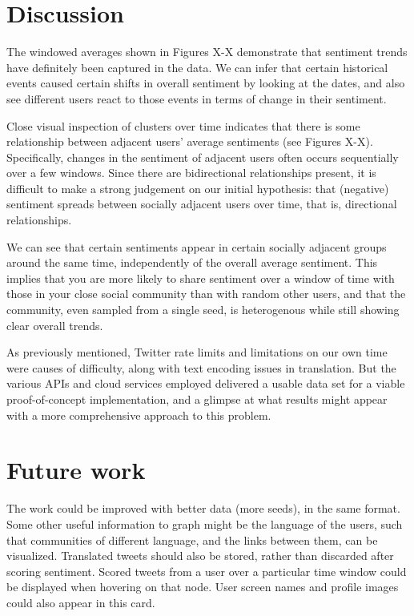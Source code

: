 \documentclass[11pt]{article}
\begin{document}
\section{Discussion}
The windowed averages shown in Figures X-X demonstrate that sentiment trends have definitely been captured in the data. We can infer that certain historical events caused certain shifts in overall sentiment by looking at the dates, and also see different users react to those events in terms of change in their sentiment.\newline

Close visual inspection of clusters over time indicates that there is some relationship between adjacent users' average sentiments (see Figures X-X). Specifically, changes in the sentiment of adjacent users often occurs sequentially over a few windows. Since there are bidirectional relationships present, it is difficult to make a strong judgement on our initial hypothesis: that (negative) sentiment spreads between socially adjacent users over time, that is, directional relationships.\newline

We can see that certain sentiments appear in certain socially adjacent groups around the same time, independently of the overall average sentiment. This implies that you are more likely to share sentiment over a window of time with those in your close social community than with random other users, and that the community, even sampled from a single seed, is heterogenous while still showing clear overall trends.\newline

As previously mentioned, Twitter rate limits and limitations on our own time were causes of difficulty, along with text encoding issues in translation. But the various APIs and cloud services employed delivered a usable data set for a viable proof-of-concept implementation, and a glimpse at what results might appear with a more comprehensive approach to this problem.


\section{Future work}
The work could be improved with better data (more seeds), in the same format. Some other useful information to graph might be the language of the users, such that communities of different language, and the links between them, can be visualized. Translated tweets should also be stored, rather than discarded after scoring sentiment. Scored tweets from a user over a particular time window could be displayed when hovering on that node. User screen names and profile images could also appear in this card.\newline
\end{document}
